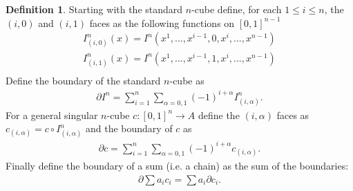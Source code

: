 \documentclass[20pt]{article}
\theoremstyle{plain}
\theoremstyle{definition}
\newtheorem{definition}{Definition}
\begin{document}
\begin{definition}
  Starting with the standard $n$-cube define, for each 
  $1 \leq i \leq n$, the $(i, 0)$ and $(i, 1)$ faces as the following
  functions on $[0, 1]^{n-1}$
  \begin{align*}
    I^n_{(i,0)}(x) = I^n(x^1, ..., x^{i-1}, 0, x^i, ..., x^{n-1}) \\
    I^n_{(i,1)}(x) = I^n(x^1, ..., x^{i-1}, 1, x^i, ..., x^{n-1}) \\
  \end{align*}
  Define the boundary of the standard $n$-cube as 
  \begin{align*}
    \partial I^n = \sum_{i=1}^n \sum_{\alpha = 0, 1} (-1)^{i + \alpha}I^n_{(i, \alpha)}.
  \end{align*}
  For a general singular $n$-cube $c: [0, 1]^n \to A$ define the $(i, \alpha)$ faces as 
  $c_{(i, \alpha)} = c \circ I^n_{(i, \alpha)}$
  and the boundary of $c$ as 
  \begin{align*}
    \partial c = \sum_{i=1}^n \sum_{\alpha = 0, 1} (-1)^{i + \alpha}c_{(i, \alpha)}.
  \end{align*}
  Finally define the boundary of a sum (i.e. a chain) as the sum of the boundaries:
  \begin{align*}
    \partial \sum a_ic_i = \sum a_i \partial c_i.
  \end{align*}
\end{definition}

  
\end{document}
